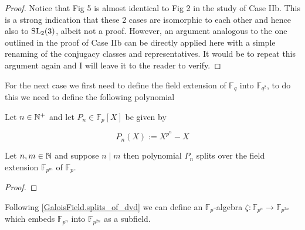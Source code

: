 \begin{proof}


Notice that Fig 5 is almost identical to Fig 2 in the study of Case IIb. This is a strong indication that these 2 cases are isomorphic to each other and hence also to $\operatorname{SL}_2(3)$, albeit not a proof. However, an argument analogous to the one outlined in the proof of Case IIb can be directly applied here with a simple renaming of the conjugacy classes and representatives. It would be to repeat this argument again and I will leave it to the reader to verify.


\end{proof}


For the next case we first need to define the field extension of $\mathbb{F}_q$ into $\mathbb{F}_{q^2}$, to do this we need
to define the following polynomial
\begin{definition}
    \label{GaloisField.polynomial}
    \leanok
    Let $n \in \mathbb{N}^+$ and let $P_n \in \mathbb{F}_p[X]$ be given by

    \[
    P_n(X) := X^{p^n} - X
    \]
\end{definition}


\begin{lemma}
    \label{GaloisField.splits_of_dvd}
    \leanok
    Let $n,m \in \mathbb{N}$ and suppose $n \mid m$ then polynomial $P_{n}$ splits over
    the field extension $\mathbb{F}_{p^{m}}$ of $\mathbb{F}_{p}$.
\end{lemma}
\begin{proof}
    \leanok
\end{proof}


\begin{definition}
    \label{GaloisField.algHom_of_dvd}
    \leanok
    Following \ref{GaloisField.splits_of_dvd} we can define an $\mathbb{F}_p$-algebra 
    $\zeta : \mathbb{F}_{p^n} \rightarrow \mathbb{F}_{p^{2n}}$ which embeds $\mathbb{F}_{p^n}$ into $\mathbb{F}_{p^{2n}}$ as a subfield.
\end{definition}


